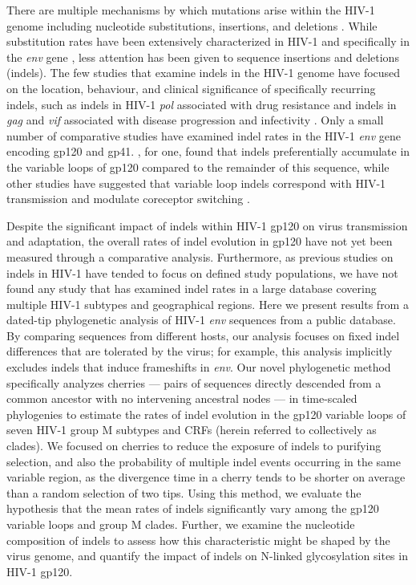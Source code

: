\documentclass[12pt]{article}
\newcommand{\todo}[2]{\hl{\textbf{#1:} #2}}
\begin{document}
There are multiple mechanisms by which mutations arise within the HIV-1 genome including nucleotide substitutions, insertions, and deletions \citep{Abram:2010}.
While substitution rates have been extensively characterized in HIV-1 and specifically in the \textit{env} gene \citep{Keulen:1996, Nielsen:1998}, less attention has been given to sequence insertions and deletions (indels).  
The few studies that examine indels in the HIV-1 genome have focused on the location, behaviour, and clinical significance of specifically recurring indels, such as indels in HIV-1 \textit{pol} associated with drug resistance and indels in \textit{gag} and \textit{vif} associated with disease progression and infectivity \citep{Rakik:1999, Aralaguppe:2017, Alexander:2002}. 
Only a small number of comparative studies have examined indel rates in the HIV-1 \textit{env} gene encoding gp120 and gp41.
\citet{wood2009hiv}, for one, found that indels preferentially accumulate in the variable loops of gp120 compared to the remainder of this sequence, while other studies have suggested that variable loop indels correspond with HIV-1 transmission and modulate coreceptor switching \citep{Derdeyn:2004, Tsuchiya:2013}. 

Despite the significant impact of indels within HIV-1 gp120 on virus transmission and adaptation, the overall rates of indel evolution in gp120 have not yet been measured through a comparative analysis.
Furthermore, as previous studies on indels in HIV-1 have tended to focus on defined study populations, we have not found any study that has examined indel rates in a large database covering multiple HIV-1 subtypes and geographical regions.
Here we present results from a dated-tip phylogenetic analysis of HIV-1 \textit{env} sequences from a public database.
By comparing sequences from different hosts, our analysis focuses on fixed indel differences that are tolerated by the virus; for example, this analysis implicitly excludes indels that induce frameshifts in \textit{env}.
Our novel phylogenetic method specifically analyzes cherries \citep{mckenzie2000distributions} --- pairs of sequences directly descended from a common ancestor with no intervening ancestral nodes --- in time-scaled phylogenies to estimate the rates of indel evolution in the gp120 variable loops of seven HIV-1 group M subtypes and CRFs (herein referred to collectively as clades).
We focused on cherries to reduce the exposure of indels to purifying selection, and also the probability of multiple indel events occurring in the same variable region, as the divergence time in a cherry tends to be shorter on average than a random selection of two tips.
Using this method, we evaluate the hypothesis that the mean rates of indels significantly vary among the gp120 variable loops and group M clades.
Further, we examine the nucleotide composition of indels to assess how this characteristic might be shaped by the virus genome, and quantify the impact of indels on N-linked glycosylation sites in HIV-1 gp120.
\end{document}
